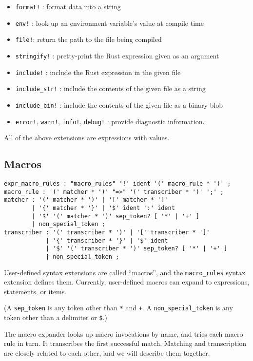 \documentclass[]{article}
\begin{document}
\begin{itemize}
\itemsep1pt\parskip0pt
\item
  \texttt{format!} : format data into a string
\item
  \texttt{env!} : look up an environment variable's value at compile
  time
\item
  \texttt{file!}: return the path to the file being compiled
\item
  \texttt{stringify!} : pretty-print the Rust expression given as an
  argument
\item
  \texttt{include!} : include the Rust expression in the given file
\item
  \texttt{include\_str!} : include the contents of the given file as a
  string
\item
  \texttt{include\_bin!} : include the contents of the given file as a
  binary blob
\item
  \texttt{error!}, \texttt{warn!}, \texttt{info!}, \texttt{debug!} :
  provide diagnostic information.
\end{itemize}

All of the above extensions are expressions with values.

\subsection{Macros}\label{macros}

\begin{verbatim}
expr_macro_rules : "macro_rules" '!' ident '(' macro_rule * ')' ;
macro_rule : '(' matcher * ')' "=>" '(' transcriber * ')' ';' ;
matcher : '(' matcher * ')' | '[' matcher * ']'
        | '{' matcher * '}' | '$' ident ':' ident
        | '$' '(' matcher * ')' sep_token? [ '*' | '+' ]
        | non_special_token ;
transcriber : '(' transcriber * ')' | '[' transcriber * ']'
            | '{' transcriber * '}' | '$' ident
            | '$' '(' transcriber * ')' sep_token? [ '*' | '+' ]
            | non_special_token ;
\end{verbatim}

User-defined syntax extensions are called ``macros'', and the
\texttt{macro\_rules} syntax extension defines them. Currently,
user-defined macros can expand to expressions, statements, or items.

(A \texttt{sep\_token} is any token other than \texttt{*} and
\texttt{+}. A \texttt{non\_special\_token} is any token other than a
delimiter or \texttt{\$}.)

The macro expander looks up macro invocations by name, and tries each
macro rule in turn. It transcribes the first successful match. Matching
and transcription are closely related to each other, and we will
describe them together.
\end{document}
